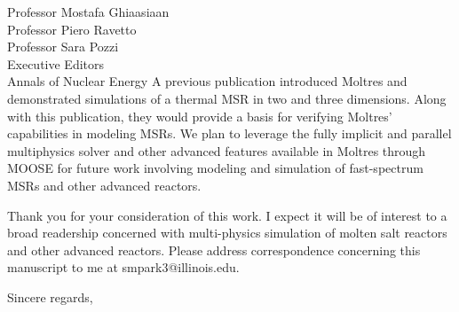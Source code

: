 \documentclass[11pt]{letter} %
\begin{document}
\begin{letter}{Professor Mostafa Ghiaasiaan\\
Professor Piero Ravetto\\
Professor Sara Pozzi\\
Executive Editors\\
Annals of Nuclear Energy}
A previous publication introduced Moltres and demonstrated simulations of a
thermal MSR in two and three dimensions. Along with this publication, they
would provide a basis for verifying Moltres' capabilities in modeling MSRs. We
plan to leverage the fully implicit and parallel multiphysics solver and other
advanced features available in Moltres through MOOSE for future work involving
modeling and simulation of fast-spectrum MSRs and other advanced reactors.

Thank you for your consideration of this work. I expect it will be of interest
to a broad readership concerned with multi-physics simulation of molten salt
reactors and other advanced reactors. Please address correspondence concerning
this manuscript to me at smpark3@illinois.edu.

\closing{\hspace{3cm} Sincere regards,}


\end{letter}
\end{document}
